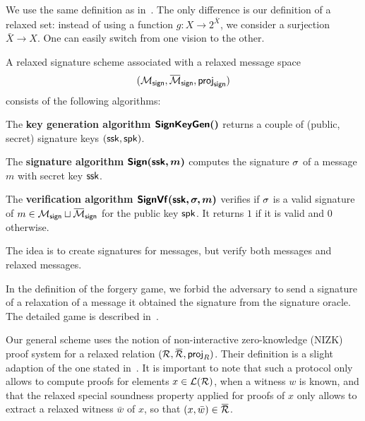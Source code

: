 
\label{sec:relaxed_signature_scheme}
	We use the same definition as in~\cite[Section 5.1]{ISC:BosCamNev18}. The 
only difference is our definition of a relaxed set: instead of using 
a function $g: X \rightarrow 2^{\bar{X}}$, we consider a surjection $\bar{X} 
\rightarrow X$. One can easily switch from one vision to the other.

A relaxed signature scheme  associated with a relaxed message 
space \begin{equation*}(\SetMessSign,\SetRelMessSign, \projsign)\end{equation*} consists of 
the following algorithms:


\begin{compactitem}
	\item The \textbf{key generation algorithm $\bm{\mathsf{SignKeyGen}()}$} returns a 
couple of (public, secret) signature keys $(\mathsf{ssk}, \mathsf{spk})$.
	\item The \textbf{signature algorithm $\bm{\mathsf{Sign}(\mathsf{ssk}, m)}$} computes the 
signature $\sigma$ of a	message $m$ with secret key $\mathsf{ssk}$.
	\item The \textbf{verification algorithm $\bm{\mathsf{SignVf}(\mathsf{ssk}, \sigma, 
m)}$} verifies if $\sigma$ is a valid signature of $m \in \SetMessSign 
\sqcup \SetRelMessSign$ for the public key $\mathsf{spk}$. It returns $1$ if it is 
valid and $0$ otherwise.
\end{compactitem}

The idea is to create signatures for messages, but verify both messages and 
relaxed messages.
	 
In the definition of the forgery game, we forbid the adversary to send a 
signature of a relaxation of a message it obtained the signature from the signature oracle. The 
detailed game is described in~\cite[Section 5.1]{ISC:BosCamNev18}.


	Our general scheme uses the notion of non-interactive zero-knowledge 
(NIZK) proof system for a relaxed relation $(\relation,\barrelation, \proj_R)$.
Their definition is a slight adaption 
 of the one stated in~\cite[Section 3.1]{ISC:BosCamNev18}. It is 
important to note that such a protocol
only allows to compute proofs for elements $x \in \mathcal{L}(\mathcal{R})$, 
when a witness $w$ is known,
 and that the relaxed special soundness property applied for proofs of 
$x$ only allows to extract a
 relaxed witness $\bar{w}$ of $x$, so that $(x, \bar{w}) \in 
\barrelation$.

